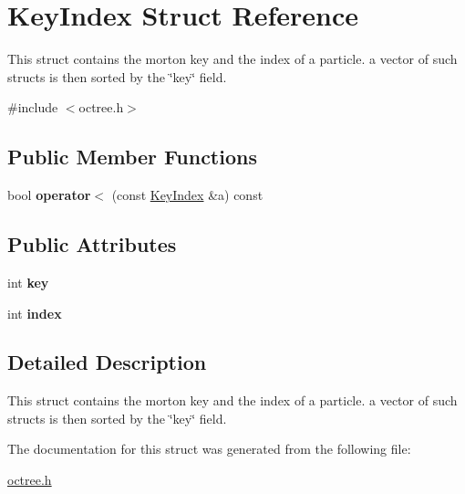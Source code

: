 \hypertarget{structKeyIndex}{\section{Key\-Index Struct Reference}
\label{structKeyIndex}
}


This struct contains the morton key and the index of a particle. a vector of such structs is then sorted by the \char`\"{}key\char`\"{} field.  




{\ttfamily \#include $<$octree.\-h$>$}

\subsection*{Public Member Functions}
\begin{DoxyCompactItemize}
\item 
\hypertarget{structKeyIndex_add3acab245c56654038ed2fa7767cbdd}{bool {\bfseries operator$<$} (const \hyperlink{structKeyIndex}{Key\-Index} \&a) const }\label{structKeyIndex_add3acab245c56654038ed2fa7767cbdd}

\end{DoxyCompactItemize}
\subsection*{Public Attributes}
\begin{DoxyCompactItemize}
\item 
\hypertarget{structKeyIndex_a295cabcb7cd3d9acf0aac6a2b6ec58fd}{int {\bfseries key}}\label{structKeyIndex_a295cabcb7cd3d9acf0aac6a2b6ec58fd}

\item 
\hypertarget{structKeyIndex_ad67b48894485303bdfd1ae11c77c4239}{int {\bfseries index}}\label{structKeyIndex_ad67b48894485303bdfd1ae11c77c4239}

\end{DoxyCompactItemize}


\subsection{Detailed Description}
This struct contains the morton key and the index of a particle. a vector of such structs is then sorted by the \char`\"{}key\char`\"{} field. 

The documentation for this struct was generated from the following file\-:\begin{DoxyCompactItemize}
\item 
\hyperlink{octree_8h}{octree.\-h}\end{DoxyCompactItemize}
